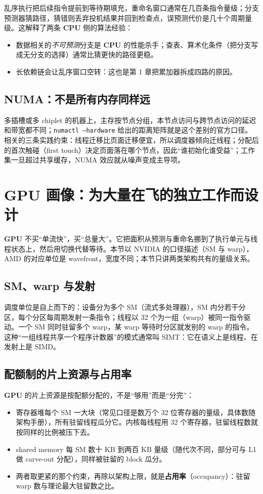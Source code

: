 \documentclass[12pt,a4paper,fontset=fandol]{ctexbook}
\newcommand{\Tp}[1]{\texttt{#1}}
\newcommand{\Dom}[1]{\textsf{\bfseries #1}}
\newcommand{\CPU}{\Dom{CPU}}
\newcommand{\GPU}{\Dom{GPU}}
\begin{document}
乱序执行把后续指令提前到等待期填充，重命名窗口通常在几百条指令量级；分支预测器猜路径，猜错则丢弃投机结果并回到检查点，误预测代价是几十个周期量级。这解释了两条 \CPU{} 侧的算法经验：
\begin{itemize}
\item 数据相关的\emph{不可预测}分支是 \CPU{} 的性能杀手；查表、算术化条件（把分支写成无分支的选择）通常比猜更快的路径更稳。
\item 长依赖链会让乱序窗口空转：这也是第 1 章把累加器拆成四路的原因。
\end{itemize}

\subsection{NUMA：不是所有内存同样远}

多插槽或多 chiplet 的机器上，主存按节点分组，本节点访问与跨节点访问的延迟和带宽都不同；\Tp{numactl --hardware} 给出的距离矩阵就是这个差别的官方口径。相关的三条实践约束：线程迁移比页面迁移便宜，所以调度器倾向迁线程；分配后的首次触碰（first touch）决定页面落在哪个节点，因此``谁初始化谁受益''；工作集一旦超过共享缓存，NUMA 效应就从噪声变成主导项。

\section{GPU 画像：为大量在飞的独立工作而设计}

\GPU{} 不买``单流快''，买``总量大''。它把面积从预测与重命名挪到了执行单元与线程状态上，然后用切换代替等待。本节以 NVIDIA 的口径描述（SM 与 warp），AMD 的对应单位是 wavefront，宽度不同；本节只讲两类架构共有的量级关系。

\subsection{SM、warp 与发射}

调度单位是自上而下的：设备分为多个 SM（流式多处理器），SM 内分若干分区，每个分区每周期发射一条指令；线程以 32 个为一组（warp）被同一指令驱动。一个 SM 同时驻留多个 warp，某 warp 等待时分区就发别的 warp 的指令。这种``一组线程共享一个程序计数器''的模式通常叫 SIMT：它在语义上是线程、在发射上是 SIMD。

\subsection{配额制的片上资源与占用率}

\GPU{} 的片上资源是按配额分配的，不是``够用''而是``分完''：
\begin{itemize}
\item 寄存器堆每个 SM 一大块（常见口径是数万个 32 位寄存器的量级，具体数随架构手册），所有驻留线程瓜分它。内核每线程用 32 个寄存器，驻留线程数就按同样的比例被压下去。
\item shared memory 每 SM 数十 KB 到两百 KB 量级（随代次不同，部分可与 L1 做 carve-out 分配），同样被驻留的 block 瓜分。
\item 两者取更紧的那个约束，再除以架构上限，就是\textbf{占用率}（occupancy）：驻留 warp 数与理论最大驻留数之比。
\end{itemize}
\end{document}
